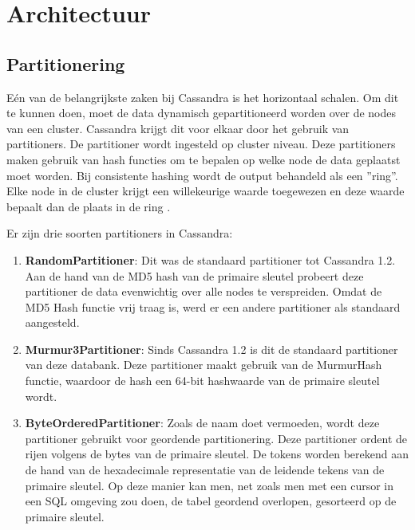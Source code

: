 \chapter{Architectuur}
\label{ch:cassandra_architectuur}

\section{Partitionering}
\label{sec:partitioner}
Eén van de belangrijkste zaken bij Cassandra is het horizontaal schalen.
Om dit te kunnen doen, moet de data dynamisch gepartitioneerd worden over de nodes van een cluster.
Cassandra krijgt dit voor elkaar door het gebruik van partitioners.
De partitioner wordt ingesteld op cluster niveau.
Deze partitioners maken gebruik van hash functies om te bepalen op welke node de data geplaatst moet worden.
Bij consistente hashing wordt de output behandeld als een ''ring''.
Elke node in de cluster krijgt een willekeurige waarde toegewezen en deze waarde bepaalt dan de plaats in de ring \citep{lakshman2010cassandra}.


Er zijn drie soorten partitioners in Cassandra:

\begin{enumerate}
	\item \textbf{RandomPartitioner}:
	Dit was de standaard partitioner tot Cassandra 1.2.
	Aan de hand van de MD5 hash van de primaire sleutel probeert deze partitioner de data evenwichtig over alle nodes te verspreiden.
	Omdat de MD5 Hash functie vrij traag is, werd er een andere partitioner als standaard aangesteld.
	
	\item \textbf{Murmur3Partitioner}:
	Sinds Cassandra 1.2 is dit de standaard partitioner van deze databank.
	Deze partitioner maakt gebruik van de MurmurHash functie, waardoor de hash een 64-bit hashwaarde van de primaire sleutel wordt.
	
	\item \textbf{ByteOrderedPartitioner}:
	Zoals de naam doet vermoeden, wordt deze partitioner gebruikt voor geordende partitionering.
	Deze partitioner ordent de rijen volgens de bytes van de primaire sleutel.
	De tokens worden berekend aan de hand van de hexadecimale representatie van de leidende tekens van de primaire sleutel.
	Op deze manier kan men, net zoals men met een cursor in een SQL omgeving zou doen, de tabel geordend overlopen, gesorteerd op de primaire sleutel.
	
\end{enumerate}


